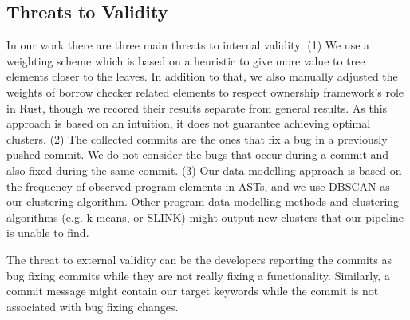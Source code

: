 \subsection{Threats to Validity}

In our work there are three main threats to internal validity: (1) We use a weighting scheme which is based on a heuristic to give more value to tree elements closer to the leaves. In addition to that, we also manually adjusted the weights of borrow checker related elements to respect ownership framework's role in Rust, though we recored their results separate from general results. As this approach is based on an intuition, it does not guarantee achieving optimal clusters. (2) The collected commits are the ones that fix a bug in a previously pushed commit. We do not consider the bugs that occur during a commit and also fixed during the same commit. (3) Our data modelling approach is based on the frequency of observed program elements in ASTs, and we use DBSCAN as our clustering algorithm. Other program data modelling methods and clustering algorithms (e.g. k-means, or SLINK) might output new clusters that our pipeline is unable to find. 

The threat to external validity can be the developers reporting the commits as bug fixing commits while they are not really fixing a functionality. Similarly, a commit message might contain our target keywords while the commit is not associated with bug fixing changes.
